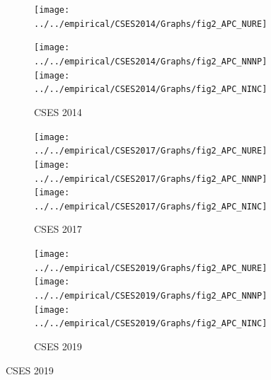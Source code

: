 \documentclass[11pt,letterpaper]{article}
\begin{document}
\begin{figure}
\caption{Average propensities to consume and the redistribution channels}\label{fig:m1}
\begin{subfigure}[b]{0.33\linewidth}
	\caption{CSES 2014} \vspace{-.5em}
	\label{fig:m1a}
	\texttt{[image: ../../empirical/CSES2014/Graphs/fig2\_APC\_NURE]} \vspace{-3em}
	\newline {}
	
	\texttt{[image: ../../empirical/CSES2014/Graphs/fig2\_APC\_NNNP]} \vspace{-3em}
	\newline {} 
	\texttt{[image: ../../empirical/CSES2014/Graphs/fig2\_APC\_NINC]} \vspace{-3em}
	\newline {}
\end{subfigure}%
\hfil
\begin{subfigure}[b]{0.33\linewidth}
	\caption{CSES 2017} \vspace{-.5em}
	\label{fig:m1b}
	\texttt{[image: ../../empirical/CSES2017/Graphs/fig2\_APC\_NURE]} \vspace{-3em}
	\newline {}  
	\texttt{[image: ../../empirical/CSES2017/Graphs/fig2\_APC\_NNNP]} \vspace{-3em}
	\newline {}  
	\texttt{[image: ../../empirical/CSES2017/Graphs/fig2\_APC\_NINC]} \vspace{-3em}
	\newline {}
\end{subfigure}
\hfil
\begin{subfigure}[b]{0.33\linewidth}
	\caption{CSES 2019} \vspace{-.5em}
	\label{fig:m1c}
	\texttt{[image: ../../empirical/CSES2019/Graphs/fig2\_APC\_NURE]} \vspace{-3em}
	\newline {}  
	\texttt{[image: ../../empirical/CSES2019/Graphs/fig2\_APC\_NNNP]} \vspace{-3em}
	\newline {} 
	\texttt{[image: ../../empirical/CSES2019/Graphs/fig2\_APC\_NINC]} \vspace{-3em}

\end{subfigure}
\end{figure}
\end{document}
